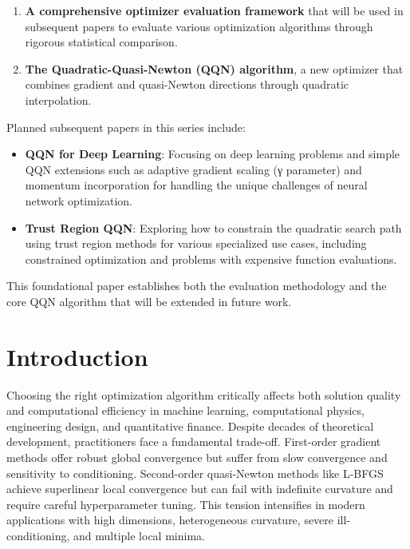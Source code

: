\begin{enumerate}
\def\labelenumi{\arabic{enumi}.}
\tightlist
\item
  \textbf{A comprehensive optimizer evaluation framework} that will be used in subsequent papers to evaluate various optimization algorithms through rigorous statistical comparison.
\item
  \textbf{The Quadratic-Quasi-Newton (QQN) algorithm}, a new optimizer that combines gradient and quasi-Newton directions through quadratic interpolation.
\end{enumerate}

Planned subsequent papers in this series include:

\begin{itemize}
\tightlist
\item
  \textbf{QQN for Deep Learning}: Focusing on deep learning problems and simple QQN extensions such as adaptive gradient scaling (γ parameter) and momentum incorporation for handling the unique challenges of neural network optimization.
\item
  \textbf{Trust Region QQN}: Exploring how to constrain the quadratic search path using trust region methods for various specialized use cases, including constrained optimization and problems with expensive function evaluations.
\end{itemize}

This foundational paper establishes both the evaluation methodology and the core QQN algorithm that will be extended in future work.

\hypertarget{introduction}{%
\section{Introduction}\label{introduction}}

Choosing the right optimization algorithm critically affects both solution quality and computational efficiency in machine learning, computational physics, engineering design, and quantitative finance.
Despite decades of theoretical development, practitioners face a fundamental trade-off.
First-order gradient methods offer robust global convergence but suffer from slow convergence and sensitivity to conditioning.
Second-order quasi-Newton methods like L-BFGS achieve superlinear local convergence but can fail with indefinite curvature and require careful hyperparameter tuning.
This tension intensifies in modern applications with high dimensions, heterogeneous curvature, severe ill-conditioning, and multiple local minima.


